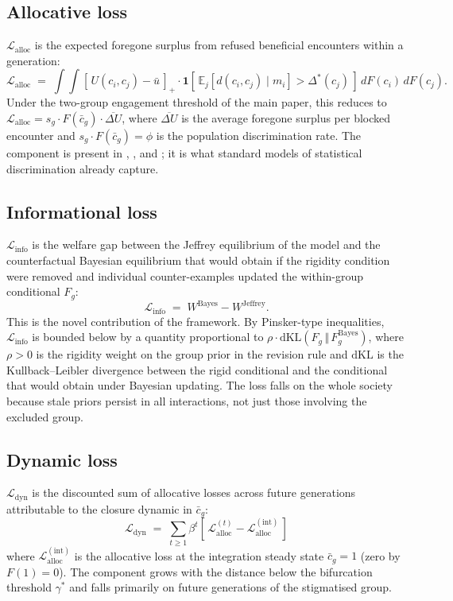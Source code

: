 \documentclass[12pt,a4paper]{article}
\theoremstyle{definition}
\numberwithin{proposition}{section}
\newcommand{\E}{\mathbb{E}}
\begin{document}
\subsection*{Allocative loss}
$\mathcal{L}_{\text{alloc}}$ is the expected foregone surplus from
refused beneficial encounters within a generation:
\begin{equation}
  \mathcal{L}_{\text{alloc}}
  \;=\; \int\!\!\!\int [\,U(c_i, c_j) - \bar{u}\,]_+
  \cdot \mathbf{1}\!\left[\,\E_j[d(c_i, c_j) \mid m_i] > \Delta^*(c_j)\,\right]
  \, dF(c_i)\, dF(c_j).
  \label{eq:L-alloc}
\end{equation}
Under the two-group engagement threshold of the main paper, this
reduces to $\mathcal{L}_{\text{alloc}} = s_g \cdot F(\bar{c}_g) \cdot
\overline{\Delta U}$, where $\overline{\Delta U}$ is the average
foregone surplus per blocked encounter and $s_g \cdot F(\bar{c}_g) = \phi$
is the population discrimination rate. The component is present
in \citet{Phelps1972}, \citet{Arrow1973}, and \citet{Loury2002}; it
is what standard models of statistical discrimination already
capture.

\subsection*{Informational loss}
$\mathcal{L}_{\text{info}}$ is the welfare gap between the Jeffrey
equilibrium of the model and the counterfactual Bayesian equilibrium
that would obtain if the rigidity condition were removed and
individual counter-examples updated the within-group conditional
$F_g$:
\begin{equation}
  \mathcal{L}_{\text{info}}
  \;=\; W^{\mathrm{Bayes}} - W^{\mathrm{Jeffrey}}.
  \label{eq:L-info}
\end{equation}
This is the novel contribution of the framework. By Pinsker-type
inequalities, $\mathcal{L}_{\text{info}}$ is bounded below by a
quantity proportional to $\rho \cdot \mathrm{dKL}(F_g \,\Vert\, F_g^{\mathrm{Bayes}})$,
where $\rho > 0$ is the rigidity weight on the group prior in the
revision rule and $\mathrm{dKL}$ is the Kullback--Leibler divergence
between the rigid conditional and the conditional that would obtain
under Bayesian updating. The loss falls on the whole society because
stale priors persist in all interactions, not just those involving
the excluded group.

\subsection*{Dynamic loss}
$\mathcal{L}_{\text{dyn}}$ is the discounted sum of allocative losses
across future generations attributable to the closure dynamic in
$\bar{c}_g$:
\begin{equation}
  \mathcal{L}_{\text{dyn}}
  \;=\; \sum_{t \geq 1} \beta^t \!\left[\,
  \mathcal{L}_{\text{alloc}}^{(t)} - \mathcal{L}_{\text{alloc}}^{(\mathrm{int})}
  \,\right]
  \label{eq:L-dyn}
\end{equation}
where $\mathcal{L}_{\text{alloc}}^{(\mathrm{int})}$ is the allocative
loss at the integration steady state $\bar{c}_g = 1$ (zero by
$F(1) = 0$). The component grows with the distance below the
bifurcation threshold $\gamma^*$ and falls primarily on future
generations of the stigmatised group.
\end{document}
